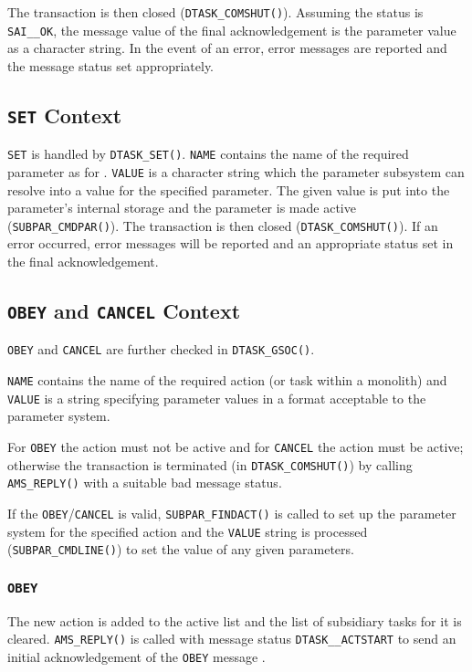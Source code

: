 \documentclass[twoside,11pt,nolof]{starlink}
\begin{document}
The transaction is then closed (\texttt{DTASK\_COMSHUT()}). Assuming the
status is \texttt{SAI\_\_OK}, the message value of the final acknowledgement is
the parameter value as a character string.  In the event of an error, error
messages are reported and the message status set appropriately.

\subsection{\label{set_context}\texttt{SET} Context}
\texttt{SET} is handled by \texttt{DTASK\_SET()}.
\texttt{NAME} contains the name of the required parameter as for
.
\texttt{VALUE} is a character string which the parameter subsystem can resolve
into a value for the specified parameter.
The given value is put into the parameter's internal storage and the parameter
is made active (\texttt{SUBPAR\_CMDPAR()}).
The transaction is then closed (\texttt{DTASK\_COMSHUT()}). If an error
occurred, error messages will be reported and an appropriate status set in
the final acknowledgement.

\subsection{\label{obey_and_cancel_context}
\texttt{OBEY} and \texttt{CANCEL} Context}
\texttt{OBEY} and \texttt{CANCEL} are further checked in
\texttt{DTASK\_GSOC()}.

\texttt{NAME} contains the name of the required action (or task within a
monolith) and \texttt{VALUE} is a string specifying parameter
values in a format acceptable to the parameter system.

For \texttt{OBEY} the action must not be active and for \texttt{CANCEL} the
action must be active; otherwise the transaction is terminated (in
\texttt{DTASK\_COMSHUT()}) by calling \texttt{AMS\_REPLY()} with a suitable
bad message status.

If the \texttt{OBEY}/\texttt{CANCEL} is valid, \texttt{SUBPAR\_FINDACT()}
is called to set up the parameter system for the specified action and the
\texttt{VALUE} string is processed (\texttt{SUBPAR\_CMDLINE()}) to set the
value of any given parameters.

\subsubsection{\texttt{OBEY}}
The new action is added to the active list and the list of
subsidiary tasks for it is cleared. \texttt{AMS\_REPLY()} is called with
message status \texttt{DTASK\_\_ACTSTART} to send an initial acknowledgement
of the \texttt{OBEY} message .
\end{document}
